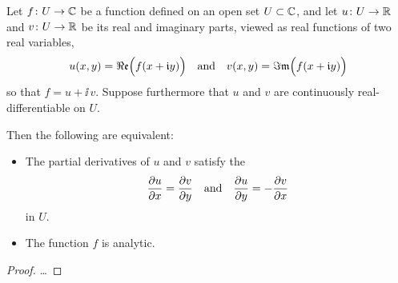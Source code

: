 \begin{theorem}
  \label{thm:cauchy_riemann}
  Let $f \colon U \to \mathbb{C}$ be a function defined on an open set $U \subset \mathbb{C}$,
  and let $u \colon U \to \mathbb{R}$ and $v \colon U \to \mathbb{R}$ be its
  real and imaginary parts, viewed as real functions of two real variables,
  \begin{align*}
    u(x,y) = \Re\mathfrak{e} \Big( f (x + \mathfrak{i} y) \Big)
    \quad \text{and} \quad
    v(x,y) = \Im\mathfrak{m} \Big( f (x + \mathfrak{i} y) \Big)
  \end{align*}
  so that $f = u + \ii \, v$.
  Suppose furthermore that $u$ and $v$ are continuously real-differentiable on $U$.

  Then the following are equivalent:
  \begin{itemize}
    \item The partial derivatives of $u$ and $v$ satisfy
          the 
          \begin{align*}
            \frac{\partial {u}}{\partial {x}} = \frac{\partial {v}}{\partial {y}}
            \quad \text{and} \quad
            \frac{\partial {u}}{\partial {y}} = - \frac{\partial {v}}{\partial {x}}
          \end{align*}
          in $U$.
    \item The function $f$ is analytic.
  \end{itemize}
%
%
\end{theorem}
\begin{proof}
  \ldots
\end{proof}


